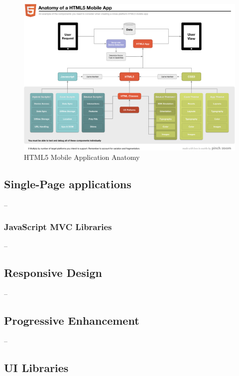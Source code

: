 \begin{figure}[ht]
  \includegraphics[width=\textwidth]{images/anatomy-of-a-html5-mobile-app.png}
  \caption{HTML5 Mobile Application Anatomy \citationneeded}
  \label{figure:anatomy-of-a-html5-mobile-app.png}
\end{figure}

\subsection{Single-Page applications}

--

\subsubsection{JavaScript MVC Libraries}

--

\subsection{Responsive Design}

--

\subsection{Progressive Enhancement}
\label{subsection:progressive-enhancement}

--

\subsection{UI Libraries}

